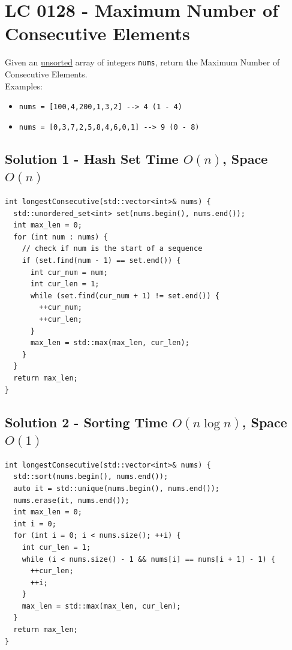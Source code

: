 \section{LC 0128 - Maximum Number of Consecutive Elements}\label{lc0128}
Given an \ul{unsorted} array of integers {\colorbox{CodeBackground}{\lstinline|nums|}}, return the Maximum Number of Consecutive Elements.\\

Examples:
\begin{itemize}
	\item {\colorbox{CodeBackground}{\lstinline|nums = [100,4,200,1,3,2] --> 4 (1 - 4)|}}
	\item {\colorbox{CodeBackground}{\lstinline|nums = [0,3,7,2,5,8,4,6,0,1] --> 9 (0 - 8)|}}
\end{itemize}

\subsection*{Solution 1 - Hash Set {\scriptsize\color{gray}\Coffeecup\hspace{1mm}Time $O(n)$, Space $O(n)$}}
\begin{lstlisting}
int longestConsecutive(std::vector<int>& nums) {
  std::unordered_set<int> set(nums.begin(), nums.end());
  int max_len = 0;
  for (int num : nums) {
    // check if num is the start of a sequence
    if (set.find(num - 1) == set.end()) {
      int cur_num = num;
      int cur_len = 1;
      while (set.find(cur_num + 1) != set.end()) {
        ++cur_num;
        ++cur_len;
      }
      max_len = std::max(max_len, cur_len);
    }
  }
  return max_len;
}
\end{lstlisting}

\subsection*{Solution 2 - Sorting {\scriptsize\color{gray}\Coffeecup\hspace{1mm}Time $O(n\log n)$, Space $O(1)$}}
\begin{lstlisting}
int longestConsecutive(std::vector<int>& nums) {
  std::sort(nums.begin(), nums.end());
  auto it = std::unique(nums.begin(), nums.end());
  nums.erase(it, nums.end());
  int max_len = 0;
  int i = 0;
  for (int i = 0; i < nums.size(); ++i) {
    int cur_len = 1;
    while (i < nums.size() - 1 && nums[i] == nums[i + 1] - 1) {
      ++cur_len;
      ++i;
    }
    max_len = std::max(max_len, cur_len);
  }
  return max_len;
}
\end{lstlisting}

